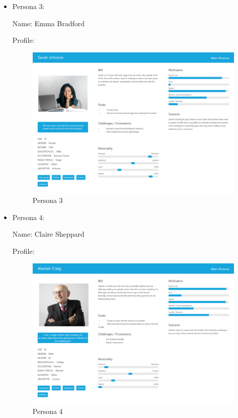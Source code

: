 \documentclass[12pt]{article}
\begin{document}
\begin{itemize}
		\item Persona 3:
		
		Name: Emma Bradford
		
		Profile: 
		\begin{figure}[H]
			
			\includegraphics[scale=0.2]{images/persona_1.png}
			\caption{Persona 3}
			\label{fig:persona_3}
		\end{figure}
	
		\item Persona 4:
		
		Name:  Claire Sheppard
		
		
		Profile: 
		\begin{figure}[H]
			
			\includegraphics[scale=0.2]{images/persona_4.png}
			\caption{Persona 4}
			\label{fig:persona_4}
		\end{figure}
		
	\end{itemize}
\end{document}
